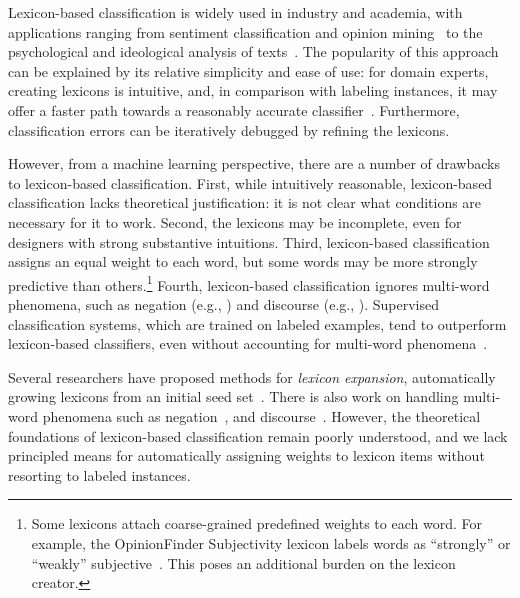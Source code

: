 Lexicon-based classification is widely used in industry and academia, with applications ranging from sentiment classification and opinion mining~\cite{pang2008opinion,liu2015sentiment} to the psychological and ideological analysis of texts~\cite{laver2000estimating,tausczik2010psychological}. %
The popularity of this approach can be explained by its relative simplicity and ease of use: for domain experts, creating lexicons is intuitive, and, in comparison with labeling instances, it may offer a faster path towards a reasonably accurate classifier~\cite{settles2011closing}. Furthermore, classification errors can be iteratively debugged by refining the lexicons.

However, from a machine learning perspective, there are a number of drawbacks to lexicon-based classification. First, while intuitively reasonable, lexicon-based classification lacks theoretical justification: it is not clear what conditions are necessary for it to work. Second, the lexicons may be incomplete, even for designers with strong substantive intuitions. Third, lexicon-based classification assigns an equal weight to each word, but some words may be more strongly predictive than others.\footnote{Some lexicons attach coarse-grained predefined weights to each word. For example, the OpinionFinder Subjectivity lexicon labels words as ``strongly'' or ``weakly'' subjective~\cite{wilson2005recognizing}. This poses an additional burden on the lexicon creator.}
Fourth, lexicon-based classification ignores multi-word phenomena, such as negation (e.g., ) and discourse (e.g., ). Supervised classification systems, which are trained on labeled examples, tend to outperform lexicon-based classifiers, even without accounting for multi-word phenomena~\cite{liu2015sentiment,pang2008opinion}.

Several researchers have proposed methods for \emph{lexicon expansion}, automatically growing lexicons from an initial seed set~\cite{hatzivassiloglou1997predicting,qiu2011opinion}. There is also work on handling multi-word phenomena such as negation~\cite{wilson2005recognizing,polanyi2006contextual}, and discourse~\cite{somasundaran2008discourse,bhatia2015better}. However, the theoretical foundations of lexicon-based classification remain poorly understood, and we lack principled means for automatically assigning weights to lexicon items without resorting to labeled instances. 

